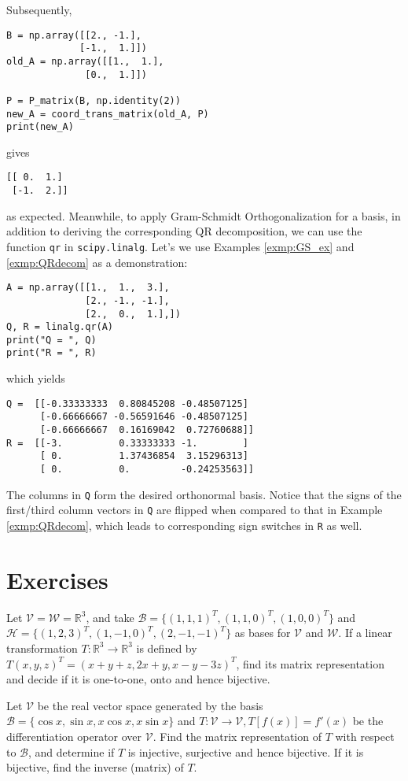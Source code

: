 Subsequently,
\begin{lstlisting}
B = np.array([[2., -1.], 
             [-1.,  1.]])
old_A = np.array([[1.,  1.], 
              [0.,  1.]])

P = P_matrix(B, np.identity(2))
new_A = coord_trans_matrix(old_A, P)
print(new_A)    
\end{lstlisting}
gives
\begin{lstlisting}
[[ 0.  1.]
 [-1.  2.]]    
\end{lstlisting}
as expected. Meanwhile, to apply Gram-Schmidt Orthogonalization for a basis, in addition to deriving the corresponding QR decomposition, we can use the function \verb|qr| in \verb|scipy.linalg|. Let's we use Examples \ref{exmp:GS_ex} and \ref{exmp:QRdecom} as a demonstration:
\begin{lstlisting}
A = np.array([[1.,  1.,  3.],
              [2., -1., -1.],
              [2.,  0.,  1.],])
Q, R = linalg.qr(A)
print("Q = ", Q)
print("R = ", R)
\end{lstlisting}
which yields
\begin{lstlisting}
Q =  [[-0.33333333  0.80845208 -0.48507125]
      [-0.66666667 -0.56591646 -0.48507125]
      [-0.66666667  0.16169042  0.72760688]]
R =  [[-3.          0.33333333 -1.        ]
      [ 0.          1.37436854  3.15296313]
      [ 0.          0.         -0.24253563]]
\end{lstlisting}
The columns in \verb|Q| form the desired orthonormal basis. Notice that the signs of the first/third column vectors in \verb|Q| are flipped when compared to that in Example \ref{exmp:QRdecom}, which leads to corresponding sign switches in \verb|R| as well.

\section{Exercises}

\begin{Exercise}
Let $\mathcal{V} = \mathcal{W} = \mathbb{R}^3$, and take $\mathcal{B} = \{(1,1,1)^T, (1,1,0)^T, (1,0,0)^T\}$ and $\mathcal{H} = \{(1,2,3)^T, (1,-1,0)^T, (2,-1,-1)^T\}$ as bases for $\mathcal{V}$ and $\mathcal{W}$. If a linear transformation $T: \mathbb{R}^3 \to \mathbb{R}^3$ is defined by $T(x,y,z)^T = (x+y+z,2x+y,x-y-3z)^T$, find its matrix representation and decide if it is one-to-one, onto and hence bijective.
\end{Exercise}

\begin{Exercise}
Let $\mathcal{V}$ be the real vector space generated by the basis $\mathcal{B} = \{\cos x, \sin x, x\cos x, x\sin x\}$ and $T: \mathcal{V} \to \mathcal{V}, T[f(x)] = f'(x)$ be the differentiation operator over $\mathcal{V}$. Find the matrix representation of $T$ with respect to $\mathcal{B}$, and determine if $T$ is injective, surjective and hence bijective. If it is bijective, find the inverse (matrix) of $T$.
\end{Exercise}

